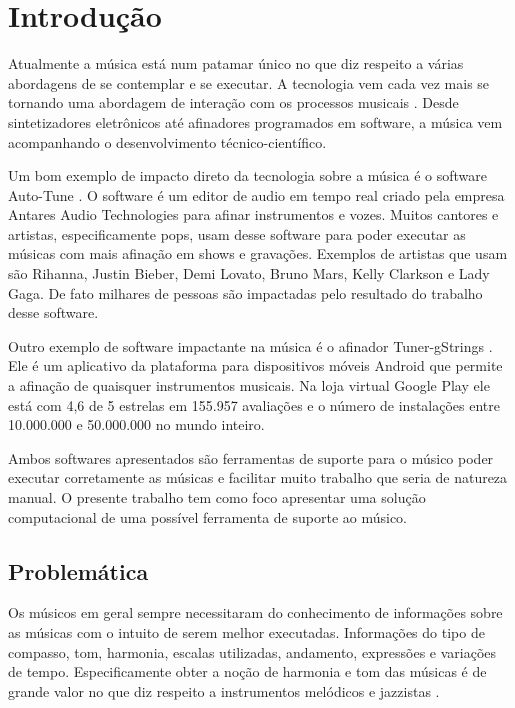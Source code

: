 \chapter[Introdução]{Introdução}
\label{chap:introducao}

Atualmente a música está num patamar único no que diz respeito a várias abordagens de se contemplar e se executar. A tecnologia vem cada vez mais se tornando uma abordagem de interação com os processos musicais \cite{makingmusictechnology}. Desde sintetizadores eletrônicos até afinadores programados em software, a música vem acompanhando o desenvolvimento técnico-científico.

Um bom exemplo de impacto direto da tecnologia sobre a música é o software Auto-Tune \cite{autotune}. O software é um editor de audio em tempo real criado pela empresa Antares Audio Technologies \cite{autotune2} para afinar instrumentos e vozes. Muitos cantores e artistas, especificamente pops, usam desse software para poder executar as músicas com mais afinação em shows e gravações. Exemplos de artistas que usam são Rihanna, Justin Bieber, Demi Lovato, Bruno Mars, Kelly Clarkson e Lady Gaga. De fato milhares de pessoas são impactadas pelo resultado do trabalho desse software.

Outro exemplo de software impactante na música é o afinador Tuner-gStrings \cite{afinador}. Ele é um aplicativo da plataforma para dispositivos móveis Android que permite a afinação de quaisquer instrumentos musicais. Na loja virtual Google Play ele está com 4,6 de 5 estrelas em 155.957 avaliações e o número de instalações entre 10.000.000 e 50.000.000 no mundo inteiro.

Ambos softwares apresentados são ferramentas de suporte para o músico poder executar corretamente as músicas e facilitar muito trabalho que seria de natureza manual. O presente trabalho tem como foco apresentar uma solução computacional de uma possível ferramenta de suporte ao músico.


\section{Problemática}
\label{sec:problematica}

Os músicos em geral sempre necessitaram do conhecimento de informações sobre as músicas com o intuito de serem melhor executadas. Informações do tipo de compasso, tom, harmonia, escalas utilizadas, andamento, expressões e variações de tempo. Especificamente obter a noção de harmonia e tom das músicas é de grande valor no que diz respeito a instrumentos melódicos e jazzistas \cite{jazzistas}. 

